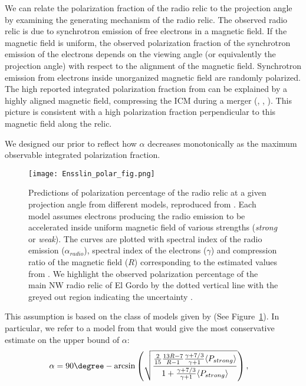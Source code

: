 We can relate the polarization fraction of the radio relic to the
projection angle by examining the
generating mechanism of the radio relic.
The observed radio relic is due to synchrotron emission of free electrons in a
magnetic field. If the magnetic field is uniform, the observed
polarization fraction of the synchrotron emission of the electrons depends on the
viewing angle (or equivalently the projection angle) with respect to the alignment of the magnetic field. 
Synchrotron emission from electrons inside unorganized magnetic field are
randomly polarized. The high reported integrated polarization fraction from
\citet{L13} can be explained by a highly aligned magnetic field,
compressing the ICM during a merger
(\citealt{E98}, \citealt{vanWeeren10}, \citealt{Feretti12}).
This picture is consistent with a high polarization fraction perpendicular
to this magnetic field along the relic. 
\par
We designed our prior to reflect how $\alpha$ decreases monotonically as the
maximum observable integrated polarization fraction. 
\begin{figure}
	\texttt{[image: Ensslin\_polar\_fig.png]}
	\caption{Predictions of polarization percentage of the radio relic at a
		given projection angle from different models, reproduced from
		\citealt{E98}. Each model assumes electrons producing the radio emission
		to be accelerated inside uniform magnetic field of various strengths ({\it strong} or 
		{\it weak}). The curves are plotted with spectral index of the radio emission
		($\alpha_{radio}$), spectral index of the electrons ($\gamma$) and
		compression ratio of the magnetic field ($R$) corresponding to the
		estimated values from \citet{L13}.
		We highlight the observed polarization percentage of the main NW radio relic
		of El Gordo by the dotted vertical line with the greyed out region
		indicating the uncertainty \citep{L13}.\label{fig:Ensslin_fig}}
\end{figure}
This assumption is based on the class of models given by \cite{E98}(See
Figure~\ref{fig:Ensslin_fig}). In particular, we refer to a model from \cite{E98} 
that would give the most
conservative estimate on the upper bound of $\alpha$:
\begin{align}
\alpha &= 90 \degree -
\arcsin
\left(
\sqrt{
\frac{
	\frac{2}{15} \frac{13R - 7}{R - 1} \frac{\gamma + 7/3}{\gamma + 1}
	\langle P_{strong} \rangle}{
	1 + \frac{\gamma + 7/3}{ \gamma +1} \langle P_{strong} \rangle }}\right),
\end{align}

